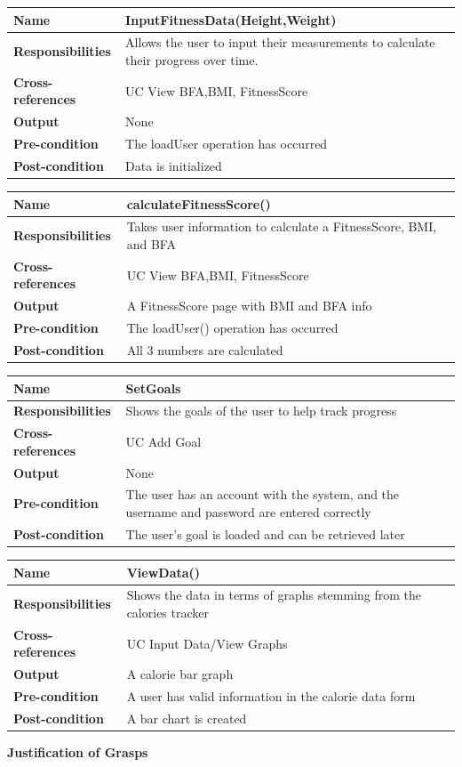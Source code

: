 \documentclass[10pt]{article}
\begin{document}
\begin{longtable}[]{@{}ll@{}}
\toprule
\textbf{Name} & \textbf{InputFitnessData(Height,Weight)}\tabularnewline
\midrule
\endhead
\textbf{Responsibilities} & Allows the user to input their measurements to calculate their progress over time.
\tabularnewline
\textbf{Cross-references} & UC View BFA,BMI, FitnessScore\tabularnewline
\textbf{Output} & None\tabularnewline
\textbf{Pre-condition} & The loadUser operation has occurred\tabularnewline
\textbf{Post-condition} &Data is initialized\tabularnewline
\bottomrule
\end{longtable}
\begin{longtable}[]{@{}ll@{}}
\toprule
\textbf{Name} & \textbf{calculateFitnessScore()}\tabularnewline
\midrule
\endhead
\textbf{Responsibilities} & Takes user information to calculate a FitnessScore, BMI, and BFA\tabularnewline
\textbf{Cross-references} & UC View BFA,BMI, FitnessScore\tabularnewline
\textbf{Output} & A FitnessScore page with BMI and BFA info\tabularnewline
\textbf{Pre-condition} & The loadUser() operation has occurred\tabularnewline
\textbf{Post-condition} & All 3 numbers are calculated\tabularnewline
\bottomrule
\end{longtable}
\begin{longtable}[]{@{}ll@{}}
\toprule
\textbf{Name} & \textbf{SetGoals}\tabularnewline
\midrule
\endhead
\textbf{Responsibilities} &Shows the goals of the user to help track progress\tabularnewline
\textbf{Cross-references} &UC Add Goal\tabularnewline
\textbf{Output} & None\tabularnewline
\textbf{Pre-condition} & The user has an account with the system, and the username and password are entered correctly\tabularnewline
\textbf{Post-condition} & The user’s goal is loaded and can be retrieved later\tabularnewline
\bottomrule
\end{longtable}
\begin{longtable}[]{@{}ll@{}}
\toprule
\textbf{Name} & \textbf{ViewData()}\tabularnewline
\midrule
\endhead
\textbf{Responsibilities} & Shows the data in terms of graphs stemming from the calories tracker\tabularnewline
\textbf{Cross-references} & UC Input Data/View Graphs\tabularnewline
\textbf{Output} & A calorie bar graph\tabularnewline
\textbf{Pre-condition} & A user has valid information in the calorie data form\tabularnewline
\textbf{Post-condition} & A bar chart is created\tabularnewline
\bottomrule
\end{longtable}


\textbf{Justification of Grasps}
\end{document}
